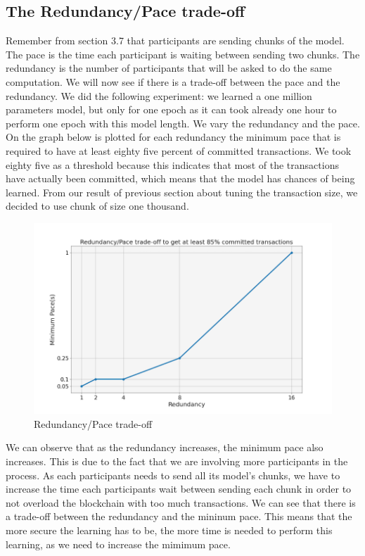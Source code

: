 \documentclass{article}
\begin{document}
\subsection{The Redundancy/Pace trade-off}
Remember from section 3.7 that participants are sending chunks of the model. The pace is the time each participant is
waiting between sending two chunks. The redundancy is the number of participants that will be asked to do the same
computation. We will now see if there is a trade-off between the pace and the redundancy. We did the following experiment:
we learned a one million parameters model, but only for one epoch as it can took already one hour to perform one epoch with
this model length. We vary the redundancy and the pace. On the graph below is plotted for each
redundancy the minimum pace that is required to have at least eighty five percent of committed transactions. We took
eighty five as a threshold because this indicates that most of the transactions have actually been committed, which
means that the model has chances of being learned. From our result of previous section about tuning the
transaction size, we decided to use chunk of size one thousand.
\begin{figure}[H]
    \hspace*{-2cm}
        \includegraphics[scale=0.75]{redundancy_pace}
    \hspace{2mm}%
    \caption{Redundancy/Pace trade-off}
\end{figure}
We can observe that as the redundancy increases, the minimum pace also increases. This is due to the fact that we are
involving more participants in the process. As each participants needs to send all its model's chunks, we have to
increase the time each participants wait between sending each chunk in order to not overload the blockchain with
too much transactions. We can see that there is a trade-off between the redundancy and the mininum pace. This means
that the more secure the learning has to be, the more time is needed to perform this learning, as we need to increase
the mimimum pace.
\end{document}

